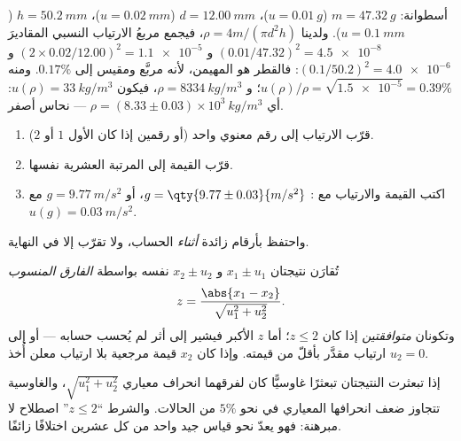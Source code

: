 \begin{example}\label{ex:b1:units-dimensions:density}
أسطوانة: $m = \qty{47.32}{g}$ ($u = \qty{0.01}{g}$)،
$d = \qty{12.00}{mm}$ ($u = \qty{0.02}{mm}$)، $h = \qty{50.2}{mm}$
($u = \qty{0.1}{mm}$). ولدينا $\rho = 4m/(\pi d^2 h)$، فيجمع مربعُ
الارتياب النسبي المقاديرَ $(0.01/47.32)^2 = \num{4.5e-8}$ و
$(2 \times 0.02/12.00)^2 = \num{1.1e-5}$ و
$(0.1/50.2)^2 = \num{4.0e-6}$: فالقطر هو المهيمن، لأنه مربَّع ومقيس
إلى $0.17\%$. ومنه $u(\rho)/\rho = \sqrt{\num{1.5e-5}}
= 0.39\%$؛ و $\rho = \qty{8334}{kg/m^3}$، فيكون
$u(\rho) = \qty{33}{kg/m^3}$: أي
$\rho = (8.33 \pm 0.03)\times10^3\ \unit{kg/m^3}$ --- نحاس أصفر.
\end{example}

\begin{method}\label{met:b1:units-dimensions:writing}
\begin{enumerate}
  \item قرّب الارتياب إلى رقم معنوي واحد (أو رقمين إذا كان الأول
        $1$ أو $2$).
  \item قرّب القيمة إلى المرتبة العشرية نفسها.
  \item اكتب القيمة والارتياب مع :
        $g = \qty{9.77\pm0.03}{m/s^2}$، أو $g = \qty{9.77}{m/s^2}$
        مع $u(g) = \qty{0.03}{m/s^2}$.
\end{enumerate}
واحتفظ بأرقام زائدة \emph{أثناء} الحساب، ولا تقرّب إلا في النهاية.
\end{method}

\begin{definition}\label{def:b1:units-dimensions:zscore}
تُقارَن نتيجتان $x_1 \pm u_1$ و $x_2 \pm u_2$  نفسه
بواسطة \emph{الفارق المنسوب}
\[
z = \frac{\abs{x_1 - x_2}}{\sqrt{u_1^2 + u_2^2}} .
\]
وتكونان \emph{متوافقتين} إذا كان $z \leq 2$؛ أما $z$ الأكبر فيشير
إلى أثر لم يُحسب حسابه --- أو إلى ارتياب مقدَّر بأقلّ من قيمته. وإذا
كان $x_2$ قيمة مرجعية بلا ارتياب معلن أُخذ $u_2 = 0$.
\end{definition}

\begin{remark}[لماذا 2]\label{rem:b1:units-dimensions:why2}
إذا تبعثرت النتيجتان تبعثرًا غاوسيًّا كان لفرقهما انحراف معياري
$\sqrt{u_1^2 + u_2^2}$، والغاوسية تتجاوز ضعف انحرافها المعياري في نحو
$5\%$ من الحالات. والشرط ``$z \leq 2$'' اصطلاح لا مبرهنة: فهو يعدّ
نحو قياس جيد واحد من كل عشرين اختلافًا زائفًا.
\end{remark}

